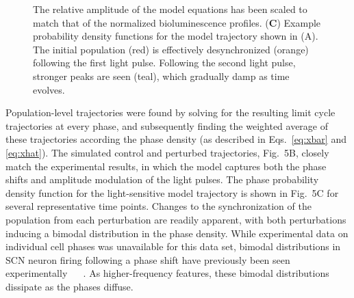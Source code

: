 \documentclass[11pt, letterpaper]{article}
\providecommand{\DIFadd}[1]{{\protect\color{blue}#1}} %
\providecommand{\DIFdel}[1]{{\protect\color{red}}}                      %
\providecommand{\DIFaddbegin}{} %
\providecommand{\DIFaddend}{} %
\providecommand{\DIFdelbegin}{} %
\providecommand{\DIFdelend}{} %
\providecommand{\DIFaddFL}[1]{\DIFadd{#1}} %
\providecommand{\DIFdelFL}[1]{\DIFdel{#1}} %
\providecommand{\DIFaddbeginFL}{} %
\providecommand{\DIFaddendFL}{} %
\providecommand{\DIFdelbeginFL}{} %
\providecommand{\DIFdelendFL}{} %
\begin{document}
\begin{figure}[tbp]
\begin{center}
{\DIFaddbeginFL \DIFaddFL{The relative amplitude of the model equations has been scaled to match that of the normalized bioluminescence profiles.
}\DIFaddendFL ({\bfseries \DIFdelbeginFL \DIFdelFL{B}\DIFdelendFL \DIFaddbeginFL \DIFaddFL{C}\DIFaddendFL }) Example probability density functions for the model trajectory shown in \DIFaddbeginFL \DIFaddFL{(}\DIFaddendFL A\DIFaddbeginFL \DIFaddFL{)}\DIFaddendFL .
 The initial population (red) is effectively desynchronized \DIFaddbeginFL \DIFaddFL{(orange) }\DIFaddendFL following the first light pulse\DIFdelbeginFL \DIFdelFL{(orange)}\DIFdelendFL .
Following the second light pulse, stronger peaks are seen (teal), which gradually damp as time evolves.} \end{center}
\end{figure}

\DIFdelbegin \DIFdel{The model-predicted }\DIFdelend \DIFaddbegin \DIFadd{Population-level trajectories were found by solving for the resulting limit cycle trajectories at every phase, and subsequently finding the weighted average of these trajectories according the phase density (as described in Eqs.~\ref{eq:xbar} and \ref{eq:xhat}).
The simulated }\DIFaddend control and perturbed trajectories, Fig.\DIFdelbegin \DIFdel{5A}\DIFdelend \DIFaddbegin \DIFadd{~5B}\DIFaddend , closely match the experimental results, in which the model captures both the phase shifts and amplitude modulation of the light pulses.
The phase probability density function for the light-sensitive model trajectory is shown in Fig.\DIFdelbegin \DIFdel{4B }\DIFdelend \DIFaddbegin \DIFadd{~5C }\DIFaddend for several representative time points.
Changes to the synchronization of the population from each perturbation are readily apparent, \DIFdelbegin \DIFdel{and }\DIFdelend \DIFaddbegin \DIFadd{with both perturbations inducing a bimodal distribution in the phase density.
While experimental data on individual cell phases was unavailable for this data set, bimodal distributions in SCN neuron firing following a phase shift have previously been seen experimentally \mbox{%
\cite{Rohling2011}
}%
.
As higher-frequency features, these bimodal distributions }\DIFaddend dissipate as the phases diffuse.
\end{document}
